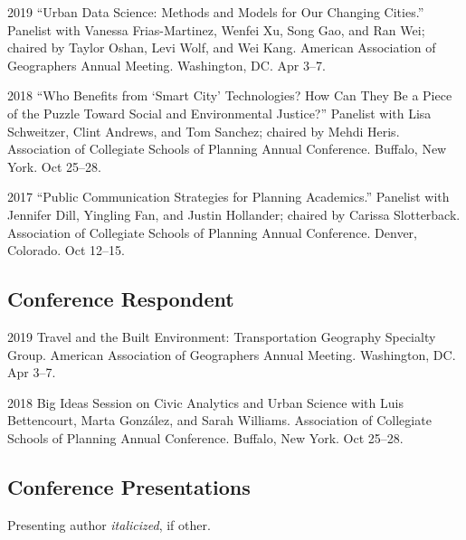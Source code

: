 \documentclass[12pt,letterpaper]{report}
\begin{document}
	\begin{tablist}

		\item[2019] \tab \enquote{Urban Data Science: Methods and Models for Our Changing Cities.} Panelist with Vanessa Frias-Martinez, Wenfei Xu, Song Gao, and Ran Wei; chaired by Taylor Oshan, Levi Wolf, and Wei Kang. American Association of Geographers Annual Meeting. Washington, DC. Apr 3--7.

		\item[2018] \tab \enquote{Who Benefits from \enquote{Smart City} Technologies? How Can They Be a Piece of the Puzzle Toward Social and Environmental Justice?} Panelist with Lisa Schweitzer, Clint Andrews, and Tom Sanchez; chaired by Mehdi Heris. Association of Collegiate Schools of Planning Annual Conference. Buffalo, New York. Oct 25--28.

		\item[2017] \tab \enquote{Public Communication Strategies for Planning Academics.} Panelist with Jennifer Dill, Yingling Fan, and Justin Hollander; chaired by Carissa Slotterback. Association of Collegiate Schools of Planning Annual Conference. Denver, Colorado. Oct 12--15.

	\end{tablist}

	\subsection*{Conference Respondent}

	\begin{tablist}

		\item[2019] \tab Travel and the Built Environment: Transportation Geography Specialty Group. American Association of Geographers Annual Meeting. Washington, DC. Apr 3--7.

		\item[2018] \tab Big Ideas Session on Civic Analytics and Urban Science with Luis Bettencourt, Marta González, and Sarah Williams. Association of Collegiate Schools of Planning Annual Conference. Buffalo, New York. Oct 25--28.

	\end{tablist}

	\subsection*{Conference Presentations}

	Presenting author \textit{italicized}, if other.\bigskip
\end{document}

